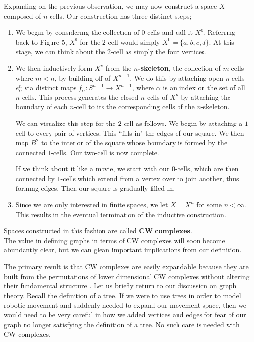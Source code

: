 Expanding on the previous observation, we may now construct a space $X$ composed of $n$-cells. Our construction has three distinct steps;
\begin{enumerate}
\item We begin by considering the collection of $0$-cells and call it $X^0$. Referring back to Figure 5, $X^0$ for the $2$-cell would simply $X^0=\{a,b,c,d\}$. At this stage, we can think about the $2$-cell as simply the four vertices.

\item We then inductively form $X^n$ from the \textbf{$n$-skeleton}, the collection of $m$-cells where $m<n$, by building off of $X^{n-1}$. We do this by attaching open $n$-cells $e^n_\alpha$ via distinct maps $f_\alpha \colon S^{n-1} \rightarrow X^{n-1}$, where $\alpha$ is an index on the set of all $n$-cells. This process generates the closed $n$-cells of $X^n$ by attaching the boundary of each $n$-cell to its the corresponding cells of the $n$-skeleton.

We can visualize this step for the $2$-cell as follows. We begin by attaching a $1$-cell to every pair of vertices. This ``fills in" the edges of our square. We then map $B^2$ to the interior of the square whose boundary is formed by the connected $1$-cells. Our two-cell is now complete.

If we think about it like a movie, we start with our $0$-cells, which are then connected by $1$-cells which extend from a vertex over to join another, thus forming edges. Then our square is gradually filled in.



\item Since we are only interested in finite spaces, we let $X=X^n$ for some $n<\infty$. This results in the eventual termination of the inductive construction.
\end{enumerate}

Spaces constructed in this fashion are called $\textbf{CW complexes}$\cite{at}. \\

The value in defining graphs in terms of CW complexes will soon become abundantly clear, but we can glean important implications from our definition. 

The primary result is that CW complexes are easily expandable because they are built from the permutations of lower dimensional CW complexes without altering their fundamental structure \cite{cw}. Let us briefly return to our discussion on graph theory. Recall the definition of a tree. If we were to use trees in order to model robotic movement and suddenly needed to expand our movement space, then we would need to be very careful in how we added vertices and edges for fear of our graph no longer satisfying the definition of a tree. No such care is needed with CW complexes.


